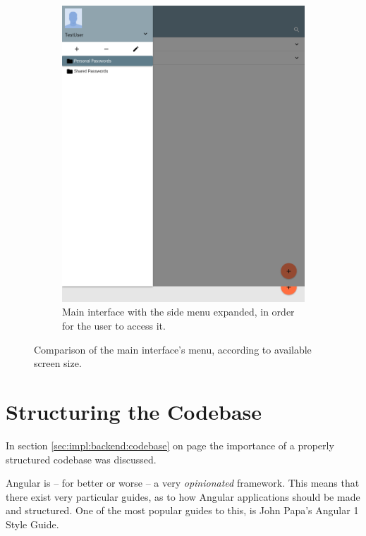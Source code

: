 \begin{figure}
			\begin{subfigure}[b]{0.75\textwidth}
				\includegraphics[width=\linewidth,clip,trim=0 800 200 0]{figures/implementation/screenshots/ghost_main_expanded_menu.png}
				\caption{Main interface with the side menu expanded, in order for the user to access it.}
				\label{fig:impl:responsive:expanded}
			\end{subfigure}
			\caption{Comparison of the main interface's menu, according to available screen size.}
			\label{fig:impl:responsive:parent}
		\end{figure}

	\section{Structuring the Codebase}
		In section \ref{sec:impl:backend:codebase} on page \pageref{sec:impl:backend:codebase} the importance of a properly structured codebase was discussed. 

		Angular is -- for better or worse -- a very \emph{opinionated} framework. This means that there exist very particular guides, as to how Angular applications should be made and structured. One of the most popular guides to this, is John Papa's Angular 1 Style Guide\cite{johnpapa_angular1}.

